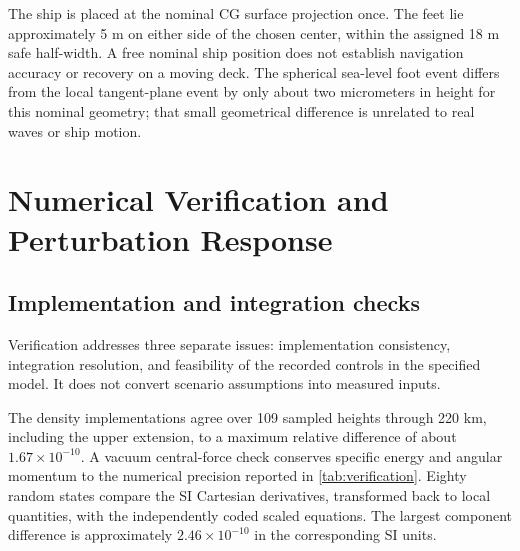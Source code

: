 \documentclass[11pt,a4paper]{article}
\begin{document}
The ship is placed at the nominal CG surface projection once. The feet lie approximately 5 m on either side of the chosen center, within the assigned 18 m safe half-width. A free nominal ship position does not establish navigation accuracy or recovery on a moving deck. The spherical sea-level foot event differs from the local tangent-plane event by only about two micrometers in height for this nominal geometry; that small geometrical difference is unrelated to real waves or ship motion.

\section{Numerical Verification and Perturbation Response}
\label{sec:verification}
\subsection{Implementation and integration checks}
Verification addresses three separate issues: implementation consistency, integration resolution, and feasibility of the recorded controls in the specified model. It does not convert scenario assumptions into measured inputs.

The density implementations agree over 109 sampled heights through 220 km, including the upper extension, to a maximum relative difference of about $1.67\times10^{-10}$. A vacuum central-force check conserves specific energy and angular momentum to the numerical precision reported in \cref{tab:verification}. Eighty random states compare the SI Cartesian derivatives, transformed back to local quantities, with the independently coded scaled equations. The largest component difference is approximately $2.46\times10^{-10}$ in the corresponding SI units.
\end{document}
